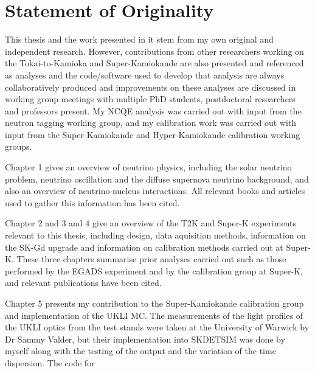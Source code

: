 \chapter*{Statement of Originality}
\thispagestyle{empty}

This thesis and the work presented in it stem from my own original and independent research. However, contributions from other researchers working on the Tokai-to-Kamioka and Super-Kamiokande are also presented and referenced as analyses and the code/software used to develop that analysis are always collaboratively produced and improvements on these analyses are discussed in working group meetings with multiple PhD students, postdoctoral researchers and professors present. My NCQE analysis was carried out with input from the neutron tagging working group, and my calibration work was carried out with input from the Super-Kamiokande and Hyper-Kamiokande calibration working groups.

Chapter 1 gives an overview of neutrino physics, including the solar neutrino problem, neutrino oscillation and the diffuse supernova neutrino background, and also an overview of neutrino-nucleus interactions. All relevant books and articles used to gather this information has been cited.

Chapter 2 and 3 and 4 give an overview of the T2K and Super-K experiments relevant to this thesis, including design, data aquisition methods, information on the SK-Gd upgrade and information on calibration methods carried out at Super-K. These three chapters summarise prior analyses carried out such as those performed by the EGADS experiment and by the calibration group at Super-K, and relevant publications have been cited. 

Chapter 5 presents my contribution to the Super-Kamiokande calibration group and implementation of the UKLI MC. The measurements of the light profiles of the UKLI optics from the test stands were taken at the University of Warwick by Dr Sammy Valder, but their implementation into SKDETSIM was done by myself along with the testing of the output and the variation of the time dispersion. The code for 